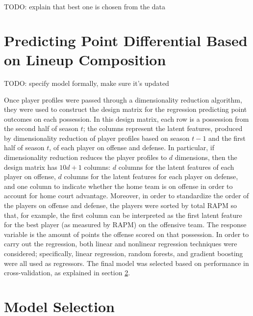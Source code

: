 TODO: explain that best one is chosen from the data

\section{Predicting Point Differential Based on Lineup Composition}
\label{sec:regress}

TODO: specify model formally, make sure it's updated

Once player profiles were passed through a dimensionality reduction algorithm, they
were used to construct the design matrix for the regression predicting point
outcomes on each possession. In this design matrix, each row is a possession from
the second half of season $t$; the columns represent the latent features, produced
by dimensionality reduction of player profiles based on season $t-1$ and the first
half of season $t$, of each player on offense and defense. In particular, if
dimensionality reduction reduces the player profiles to $d$ dimensions, then the
design matrix has $10d + 1$ columns: $d$ columns for the latent features of each
player on offense, $d$ columns for the latent features for each player on defense,
and one column to indicate whether the home team is on offense in order to account
for home court advantage. Moreover, in order to standardize the order of the players
on offense and defense, the players were sorted by total RAPM so that, for example,
the first column can be interpreted as the first latent feature for the best player
(as measured by RAPM) on the offensive team. The response variable is the amount of
points the offense scored on that possession. In order to carry out the regression,
both linear and nonlinear regression techniques were considered; specifically,
linear regression, random forests, and gradient boosting were all used as
regressors. The final model was selected based on performance in cross-validation,
as explained in section \ref{sec:mod_sel}.

\section{Model Selection}
\label{sec:mod_sel}

